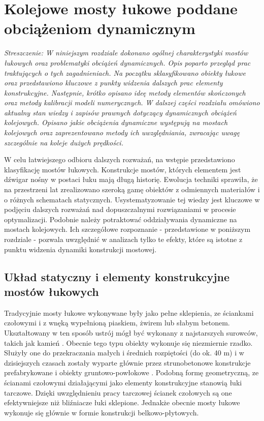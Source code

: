 \chapter{Kolejowe mosty łukowe poddane obciążeniom dynamicznym}
\textit{Streszczenie: W niniejszym rozdziale dokonano ogólnej charakterystyki mostów łukowych oraz problematyki obciążeń dynamicznych. Opis poparto przegląd prac traktujących o tych zagadnieniach. Na początku sklasyfikowano obiekty łukowe oraz przedstawiono kluczowe z punkty widzenia dalszych prac elementy konstrukcyjne. Następnie, krótko opisano ideę metody elementów skończonych oraz metody kalibracji modeli numerycznych. W dalszej części rozdziału omówiono aktualny stan wiedzy i zapisów prawnych dotyczący dynamicznych obciążeń kolejowych. Opisano jakie obciążenia dynamiczne występują na mostach kolejowych oraz zaprezentowano metody ich uwzględniania, zwracając uwagę szczególnie na koleje dużych prędkości.}

\vspace{1cm}

W celu łatwiejszego odbioru dalszych rozważań, na wstępie przedstawiono klasyfikację mostów łukowych. Konstrukcje mostów, których elementem jest dźwigar nośny w postaci łuku mają długą historię. Ewolucja techniki sprawiła, że na przestrzeni lat zrealizowano szeroką gamę obiektów z odmiennych materiałów i o różnych schematach statycznych. Usystematyzowanie tej wiedzy jest kluczowe w podjęciu dalszych rozważań nad dopuszczalnymi rozwiązaniami w procesie optymalizacji. Podobnie należy potraktować oddziaływania dynamiczne na mostach kolejowych. Ich szczegółowe rozpoznanie - przedstawione w poniższym rozdziale - pozwala uwzględnić w analizach tylko te efekty, które są istotne z punktu widzenia dynamiki konstrukcji mostowej.

\section{Układ statyczny i elementy konstrukcyjne mostów łukowych}

Tradycyjnie mosty łukowe wykonywane były jako pełne sklepienia, ze ściankami czołowymi i z wnęką wypełnioną piaskiem, żwirem lub słabym betonem. Ukształtowany w ten sposób ustrój mógł być wykonany z najstarszych surowców, takich jak kamień \parencite{Szczygie1978}. Obecnie tego typu obiekty wykonuje się niezmiernie rzadko. Służyły one do przekraczania małych i średnich rozpiętości (do ok. 40 m) i w dzisiejszych czasach zostały wyparte głównie przez strunobetonowe konstrukcje prefabrykowane \parencite{Ciesla2013} i obiekty gruntowo-powłokowe \parencite{Janusz2009,Tomala2019}. Podobną formę geometryczną, ze ścianami czołowymi działającymi jako elementy konstrukcyjne stanowią łuki tarczowe. Dzięki uwzględnieniu pracy tarczowej ścianek czołowych są one efektywniejsze niż bliźniacze łuki sklepione. Jednakże obecnie mosty łukowe wykonuje się głównie w formie konstrukcji belkowo-płytowych. 


